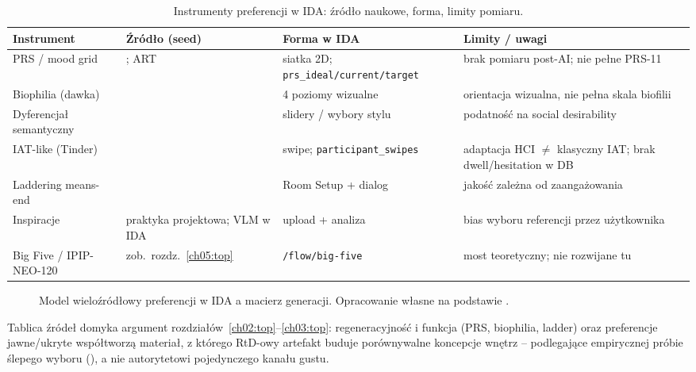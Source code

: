 \begin{table}[htbp]
  \centering
  \caption{Instrumenty preferencji w IDA: źródło naukowe, forma, limity pomiaru.}
  \label{tab:ch03:instruments}
  \begin{tabular}{@{}p{}p{}p{}p{}@{}}
    \toprule
    Instrument & Źródło (seed) & Forma w IDA & Limity / uwagi \\
    \midrule
    PRS / mood grid
      & \textcite{hartig1997prs}; ART \parencite{kaplan1995restorative}
      & siatka 2D; \texttt{prs\_ideal/current/target}
      & brak pomiaru post-AI; nie pełne PRS-11 \\
    Biophilia (dawka)
      & \textcite{kellert2008biophilic}
      & 4 poziomy wizualne
      & orientacja wizualna, nie pełna skala biofilii \\
    Dyferencjał semantyczny
      & \textcite{osgood1957measurement}
      & slidery / wybory stylu
      & podatność na social desirability \\
    IAT-like (Tinder)
      & \textcite{greenwald1998iat}
      & swipe; \texttt{participant\_swipes}
      & adaptacja HCI $\neq$ klasyczny IAT; brak dwell/hesitation w DB \\
    Laddering means-end
      & \textcite{reynolds1988laddering}
      & Room Setup + dialog
      & jakość zależna od zaangażowania \\
    Inspiracje
      & praktyka projektowa; VLM w IDA \parencite{idaPlatform2026}
      & upload + analiza
      & bias wyboru referencji przez użytkownika \\
    Big Five / IPIP-NEO-120
      & zob.\ rozdz.~\ref{ch05:top}
      & \texttt{/flow/big-five}
      & most teoretyczny; nie rozwijane tu \\
    \bottomrule
  \end{tabular}
\end{table}

\begin{figure}[htbp]
  \centering
  \caption{Model wieloźródłowy preferencji w IDA a macierz generacji.
    Opracowanie własne na podstawie \parencite{idaPlatform2026}.}
  \label{fig:ch03:multisource}
\end{figure}

Tablica źródeł domyka argument rozdziałów~\ref{ch02:top}--\ref{ch03:top}: regeneracyjność i funkcja (PRS, biophilia, ladder) oraz preferencje jawne/ukryte współtworzą materiał, z którego RtD-owy artefakt buduje porównywalne koncepcje wnętrz -- podlegające empirycznej próbie ślepego wyboru (), a nie autorytetowi pojedynczego kanału gustu.
